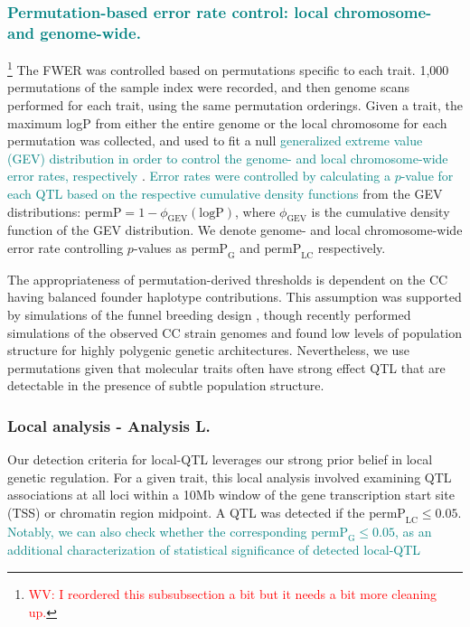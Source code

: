 \documentclass[9pt,twocolumn,twoside]{gsajnl}
\newcommand{\permplc}{\text{permP}_{\text{LC}}}
\newcommand{\permpg}{\text{permP}_{\text{G}}}
\newcommand{\WV}[2]{\textcolor{red}{#1\footnote{\textcolor{red}{WV: #2}}}}
\newcommand{\GKinline}[1]{\textcolor{teal}{#1}}
\begin{document}
\subsubsection{\GKinline{Permutation-based error rate control: local chromosome- and genome-wide.}}

\WV{}{I reordered this subsubsection a bit but it needs a bit more cleaning up.} 
The FWER was controlled based on permutations specific to each trait. 1,000 permutations of the sample index were recorded, and then genome scans performed for each trait, using the same permutation orderings. Given a trait, the maximum logP from either the entire genome or the local chromosome for each permutation was collected, and used to fit a null \GKinline{generalized extreme value (GEV) distribution \GKinline{in order to control the genome- and local chromosome-wide error rates, respectively}} \citep{Dudbridge2004}. 
\GKinline{Error rates were controlled by calculating a $p$-value for each QTL based on the respective cumulative density functions} from the GEV distributions: $\text{permP} = 1 - \phi_{\text{GEV}}(\text{logP})$, where $\phi_{\text{GEV}}$ is the cumulative density function of the GEV distribution. We denote genome- and local chromosome-wide error rate controlling  $p$-values as $\permpg$ and $\permplc$ respectively.

The appropriateness of permutation-derived thresholds \citep{Doerge1996} is dependent on the CC having balanced founder haplotype contributions. This assumption was supported by simulations of the funnel breeding design \citep{Valdar2006c}, though recently \cite{Keele2019} performed simulations of the observed CC strain genomes and found low levels of population structure for highly polygenic genetic architectures. Nevertheless, we use permutations given that molecular traits often have strong effect QTL that are detectable in the presence of subtle population structure.

\subsubsection{Local analysis - Analysis L.} 
Our detection criteria for local-QTL leverages our strong prior belief in local genetic regulation. For a given trait, this local analysis involved examining QTL associations at all loci within a 10Mb window of the gene transcription start site (TSS) or chromatin region midpoint. A QTL was detected if the $\text{permP}_{\text{LC}} \leq 0.05$. \GKinline{Notably, we can also check whether the corresponding $\text{permP}_{\text{G}} \leq 0.05$, as an additional characterization of statistical significance of detected local-QTL}
\end{document}
